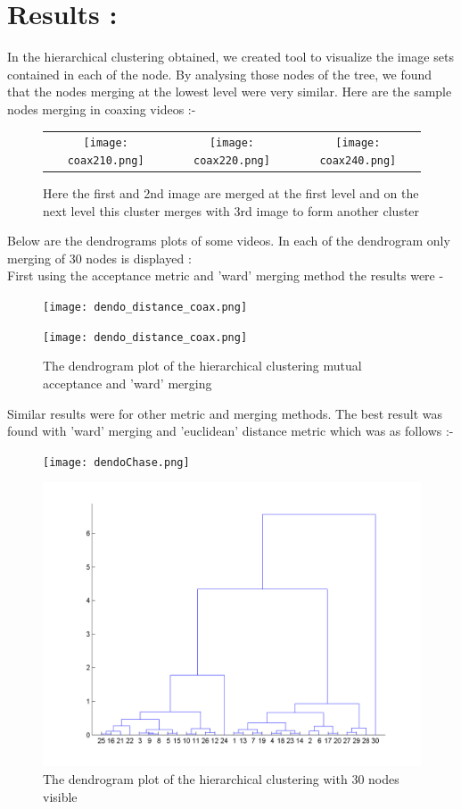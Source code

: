 \documentclass[10pt, twocolumn]{article}
\begin{document}
\section*{Results :} In the hierarchical clustering obtained, we created tool to visualize the image sets contained in each of the node. By analysing those nodes of the tree, we found that the nodes merging at the lowest level were very similar. Here are the  sample nodes merging  in coaxing videos :-\\

\begin{figure}[H]
\centering
\begin{tabular}{ccc}
\texttt{[image: coax210.png]} &
\texttt{[image: coax220.png]} &
\texttt{[image: coax240.png]} 
\end{tabular}
\caption{Here the first and 2nd image are merged at the first level and on the next level this cluster merges with 3rd image to form another cluster}
\end{figure}


Below are the dendrograms plots of some videos. In each of the dendrogram only merging of $30$ nodes is displayed :\\
First using the acceptance metric and 'ward' merging method the results were - \\

\begin{figure}[H]
\texttt{[image: dendo\_distance\_coax.png]}
\end{figure}
\begin{figure}[H]
\texttt{[image: dendo\_distance\_coax.png]}
\caption{The dendrogram plot of the hierarchical clustering mutual acceptance and 'ward' merging}
\end{figure}
Similar results were for other metric and merging methods. The best result was found with 'ward' merging and 'euclidean' distance metric which was as follows :-
\begin{figure}[H]
\texttt{[image: dendoChase.png]} 
\begin{figure}[H]
\end{figure}
\includegraphics[scale=0.3]{dendoCoax.png}
\caption{The dendrogram plot of the hierarchical clustering with 30 nodes visible}
\end{figure}
\end{document}
